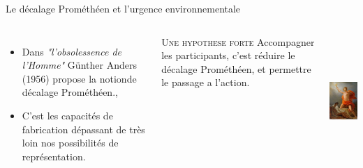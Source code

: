 \documentclass[newPxFont]{beamer}
\begin{document}
  \begin{frame}[c]{Le décalage Prométhéen et l'urgence environnementale}
    \vspace{-1cm}
    \begin{columns}[onlytextwidth,T]
      \column{\dimexpr\linewidth-30mm-5mm}
      \begin{itemize}
        \item Dans \textit{"l'obsolessence de l'Homme"} Günther Anders (1956) propose la notionde décalage Prométhéen., 
        \item C'est les capacités de fabrication dépassant de très loin nos possibilités de représentation.
      \end{itemize}
      
      \small{
        \begin{alertblock}{\textsc{Une hypothese forte}}
          Accompagner les participants, c'est réduire le décalage Prométhéen, et permettre le passage a l'action.
        \end{alertblock}
      }
      \column{30mm}
      \includegraphics[height=5cm]{img/promethee.jpg}
    \end{columns}
  \end{frame}
\end{document}
